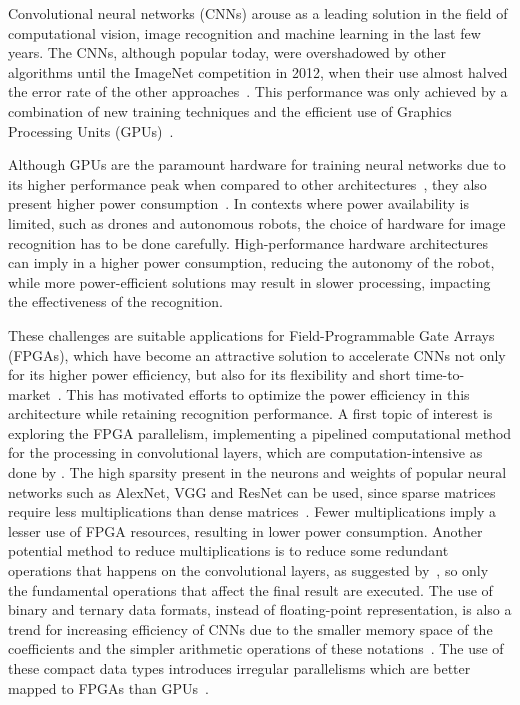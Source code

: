 \documentclass[
    12pt,                       %
    oneside,                    %
    a4paper,                    %
    brazil,                     %
    french,                     %
    spanish,                    %
    english,                    %
    ]{abntex2}
\begin{document}
Convolutional neural networks (CNNs) arouse as a leading solution in the field of computational vision, image recognition and machine learning in the last few years. The CNNs, although popular today, were overshadowed by other algorithms until the ImageNet competition in 2012, when their use almost halved the error rate of the other approaches~\cite{NIPS2012_4824}. This performance was only achieved by a combination of new training techniques and the efficient use of Graphics Processing Units (GPUs)~\cite{LeCun2015}.

Although GPUs are the paramount hardware for training neural networks due to its higher performance peak when compared to other architectures~\cite{Zhang2017, Nurvitadhi2017_1}, they also present higher power consumption~\cite{Sun2017}. In contexts where power availability is limited, such as drones and autonomous robots, the choice of hardware for image recognition has to be done carefully. High-performance hardware architectures can imply in a higher power consumption, reducing the autonomy of the robot, while more power-efficient solutions may result in slower processing, impacting the effectiveness of the recognition.

These challenges are suitable applications for Field-Programmable Gate Arrays (FPGAs), which have become an attractive solution to accelerate CNNs not only for its higher power efficiency, but also for its flexibility and short time-to-market~\cite{Zhang2017}. This has motivated efforts to optimize the power efficiency in this architecture while retaining recognition performance. A first topic of interest is exploring the FPGA parallelism, implementing a pipelined computational method for the processing in convolutional layers, which are computation-intensive as done by \textcite{Sun2017}. The high sparsity present in the neurons and weights of popular neural networks such as AlexNet, VGG and ResNet can be used, since sparse matrices require less multiplications than dense matrices~\cite{Nurvitadhi2017_1}. Fewer multiplications imply a lesser use of FPGA resources, resulting in lower power consumption. Another potential method to reduce multiplications is to reduce some redundant operations that happens on the convolutional layers, as suggested  by~\textcite{Ujiie2016}, so only the fundamental operations that affect the final result are executed. The use of binary and ternary data formats, instead of floating-point representation, is also a trend for increasing efficiency of CNNs due to the smaller memory space of the coefficients and the simpler arithmetic operations of these notations~\cite{Courbariaux2016c, NIPS2016_6573, Venkatesh2017}. The use of these compact data types introduces irregular parallelisms which are better mapped to FPGAs than GPUs~\cite{Nurvitadhi2017_1}.
\end{document}
